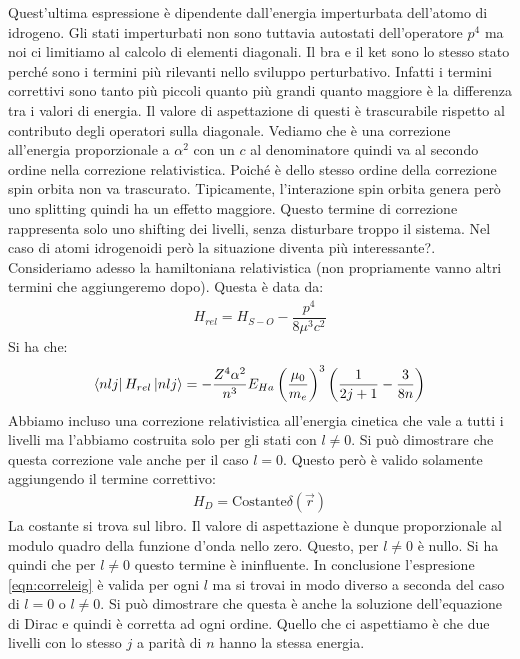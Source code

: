 \documentclass[../AppuntiStruttura]{subfiles}
\begin{document}
	Quest'ultima espressione è dipendente dall'energia imperturbata dell'atomo di idrogeno. Gli stati imperturbati non sono tuttavia autostati dell'operatore $ p^{4} $ ma noi ci limitiamo al calcolo di elementi diagonali. Il bra e il ket sono lo stesso stato perché sono i termini più rilevanti nello sviluppo perturbativo. Infatti i termini correttivi sono tanto più piccoli quanto più grandi quanto maggiore è la differenza tra i valori di energia. Il valore di aspettazione di questi è trascurabile rispetto al contributo degli operatori sulla diagonale. Vediamo che è una correzione all'energia proporzionale a $ \alpha^{2} $ con un  $ c $ al denominatore quindi va al secondo ordine nella correzione relativistica. Poiché è dello stesso ordine della correzione spin orbita non va trascurato. Tipicamente, l'interazione spin orbita genera però uno splitting quindi ha un effetto maggiore. Questo termine di correzione rappresenta solo uno shifting dei livelli, senza disturbare troppo il sistema. Nel caso di atomi idrogenoidi però la situazione diventa più interessante?. Consideriamo adesso la hamiltoniana relativistica (non propriamente vanno altri termini che aggiungeremo dopo). Questa è data da:
	\begin{gather}
		H_{rel}=H_{S-O}-\dfrac{p^{4}}{8\mu^{3}c^{2}}
	\end{gather}
	Si ha che:
	\begin{gather}
	\label{eqn:corrreleig}
	\bra{nlj}H_{rel}\ket{nlj}=-\dfrac{Z^{4}\alpha^{2}}{n^{3}}E_{Ha}\left(\dfrac{\mu_{0}}{m_{e}}\right)^{3}\left(\dfrac{1}{2j+1}-\dfrac{3}{8n}\right)
	\end{gather}
	Abbiamo incluso una correzione relativistica all'energia cinetica che vale a tutti i livelli ma l'abbiamo costruita solo per gli stati con $ l\neq0 $. Si può dimostrare che questa correzione vale anche per il caso $ l=0 $. Questo però è valido solamente aggiungendo il termine correttivo:
	\begin{gather}
	H_{D}=\text{Costante}\delta(\vec{r})
	\end{gather}
	La costante si trova sul libro. Il valore di aspettazione è dunque proporzionale al modulo quadro della funzione d'onda nello zero. Questo, per $ l\neq0 $ è nullo. Si ha quindi che per $ l\neq0 $ questo termine è ininfluente. In conclusione l'espresione \ref{eqn:correleig} è valida per ogni $ l $ ma si trovai in modo diverso a seconda del caso di $ l=0 $ o $ l\neq 0 $. Si può dimostrare che questa è anche la soluzione dell'equazione di Dirac e quindi è corretta ad ogni ordine. Quello che ci aspettiamo è che due livelli con lo stesso $ j $ a parità di $ n $ hanno la stessa energia. 
	
\end{document}
